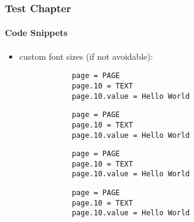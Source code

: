 
\begin{frame}[fragile]
	\frametitle{Test Chapter}
	\framesubtitle{Code Snippets}

	\begin{itemize}
		\item custom font sizes (if not avoidable):

		\lstset{
			basicstyle=\large\selectfont\ttfamily
		}

		\begin{lstlisting}
			page = PAGE
			page.10 = TEXT
			page.10.value = Hello World
		\end{lstlisting}

		\lstset{
			basicstyle=\small\selectfont\ttfamily
		}

		\begin{lstlisting}
			page = PAGE
			page.10 = TEXT
			page.10.value = Hello World
		\end{lstlisting}


		\begin{lstlisting}
			page = PAGE
			page.10 = TEXT
			page.10.value = Hello World
		\end{lstlisting}

		\lstset{
			basicstyle=\tiny\ttfamily
		}

		\begin{lstlisting}
			page = PAGE
			page.10 = TEXT
			page.10.value = Hello World
		\end{lstlisting}

	\end{itemize}


\end{frame}


